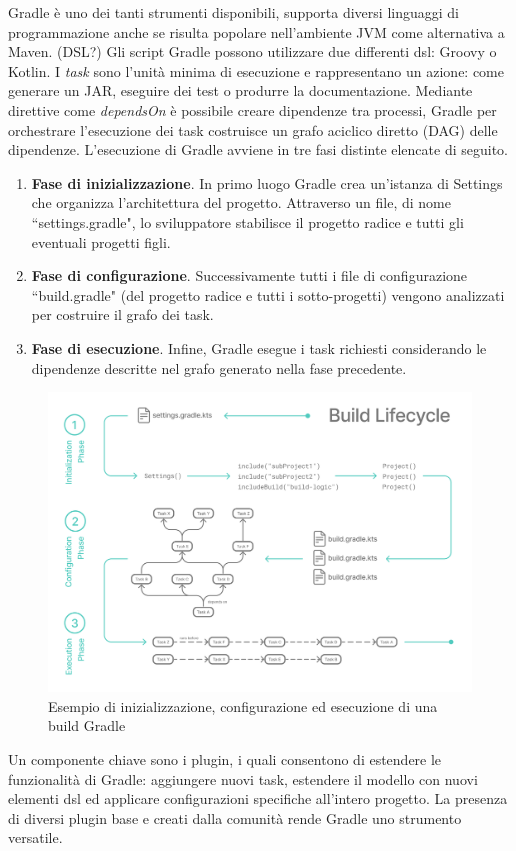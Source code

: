 Gradle è uno dei tanti strumenti disponibili, supporta diversi linguaggi di programmazione anche se risulta popolare nell'ambiente JVM come alternativa a Maven. (DSL?) Gli script Gradle possono utilizzare due differenti \ac{dsl}: Groovy o Kotlin. I \textit{task} sono l'unità minima di esecuzione e rappresentano un azione: come generare un JAR, eseguire dei test o produrre la documentazione. Mediante direttive come \textit{dependsOn} è possibile creare dipendenze tra processi, Gradle per orchestrare l'esecuzione dei task costruisce un grafo aciclico diretto (DAG) delle dipendenze. L'esecuzione di Gradle avviene in tre fasi distinte elencate di seguito.
\begin{enumerate}
	\item \textbf{Fase di inizializzazione}. In primo luogo Gradle crea un'istanza di Settings che organizza l'architettura del progetto. Attraverso un file, di nome ``settings.gradle", lo sviluppatore stabilisce il progetto radice e tutti gli eventuali progetti figli. 
	\item \textbf{Fase di configurazione}. Successivamente tutti i file di configurazione ``build.gradle" (del progetto radice e tutti i sotto-progetti) vengono analizzati per costruire il grafo dei task.
	\item \textbf{Fase di esecuzione}. Infine, Gradle esegue i task richiesti considerando le dipendenze descritte nel grafo generato nella fase precedente.
\end{enumerate}

\begin{figure}[H]
	\centering
	\includegraphics[width=.8\linewidth]{figures/gradle-build-lifecycle-example.png}
	\caption{Esempio di inizializzazione, configurazione ed esecuzione di una build Gradle}
	\label{fig:gradle-build-lifecycle}
\end{figure}
Un componente chiave sono i plugin, i quali consentono di estendere le funzionalità di Gradle: aggiungere nuovi task, estendere il modello con nuovi elementi \ac{dsl} ed applicare configurazioni specifiche all'intero progetto. La presenza di diversi plugin base e creati dalla comunità rende Gradle uno strumento versatile.
